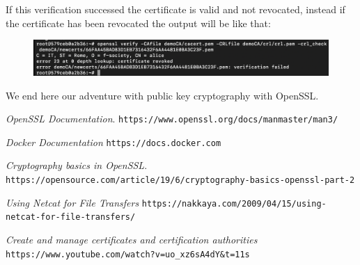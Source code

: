 \documentclass[11pt]{article}
\begin{document}
If this verification successed the certificate is valid and not revocated, instead if the certificate has been revocated the output will be like that:\newline

\begin{figure}[!ht]
  \includegraphics[width=1\textwidth]{pic7-hw6-7-1635747}
  \label{fig:crl result}
\end{figure}
We end here our adventure with public key cryptography with OpenSSL.


\vfill
\begin{thebibliography}{99}

{\em OpenSSL Documentation}. \newline
\verb|https://www.openssl.org/docs/manmaster/man3/|

{\em Docker Documentation} \newline
\verb|https://docs.docker.com|

{\em Cryptography basics in OpenSSL}. \newline
\verb|https://opensource.com/article/19/6/cryptography-basics-openssl-part-2|

{\em Using Netcat for File Transfers} \newline
\verb|https://nakkaya.com/2009/04/15/using-netcat-for-file-transfers/|

{\em Create and manage certificates and certification authorities} \newline
\verb|https://www.youtube.com/watch?v=uo_xz6sA4dY&t=11s|

\end{thebibliography}
\end{document}
